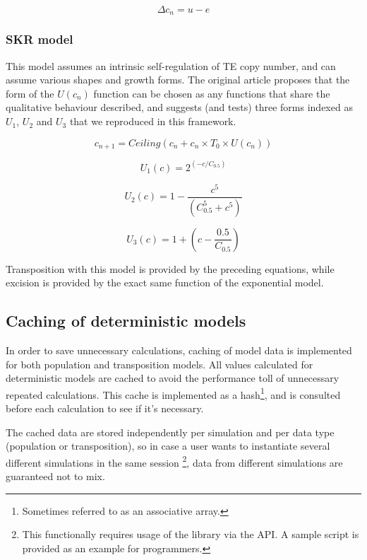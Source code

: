 \documentclass[10pt]{article}
\begin{document}
\begin{equation}
  \Delta c_n = u - e
\end{equation}


\subsubsection{SKR model}

This model assumes an intrinsic self-regulation of TE copy number, and
can assume various shapes and growth forms. The original article
proposes that the form of the $U(c_n)$ function can be chosen as any
functions that share the qualitative behaviour described, and suggests
(and tests) three forms indexed as $U_1$, $U_2$ and $U_3$ that we
reproduced in this framework.

\begin{equation}
  c_{n+1} = Ceiling(c_n + c_n \times T_0 \times U (c_n ))
\end{equation}

\begin{equation}
  U_1(c) = 2^{(-c/C_{0.5})}
\end{equation}

\begin{equation}
  U_2 (c) = 1 - \frac{c^5} {(C_{0.5}^5 + c^5 )}
\end{equation}

\begin{equation}
  U_3 (c) = 1 + (c - \frac{0.5}{C_{0.5}} )
\end{equation}

Transposition with this model is provided by the preceding equations,
while excision is provided by the exact same function of the
exponential model.

\subsection{Caching of deterministic models}
\label{section:impl_caching}

In order to save unnecessary calculations, caching of model data is
implemented for both population and transposition models. All values
calculated for deterministic models are cached to avoid the
performance toll of unnecessary repeated calculations. This cache is
implemented as a hash\footnote{Sometimes referred to as an associative
  array.}, and is consulted before each calculation to see if it's
necessary.

The cached data are stored independently per simulation and per data
type (population or transposition), so in case a user wants to
instantiate several different simulations in the same
session \footnote{This functionally requires usage of the library via
  the API. A sample script is provided as an example for
  programmers.}, data from different simulations are guaranteed not to
mix.
\end{document}
